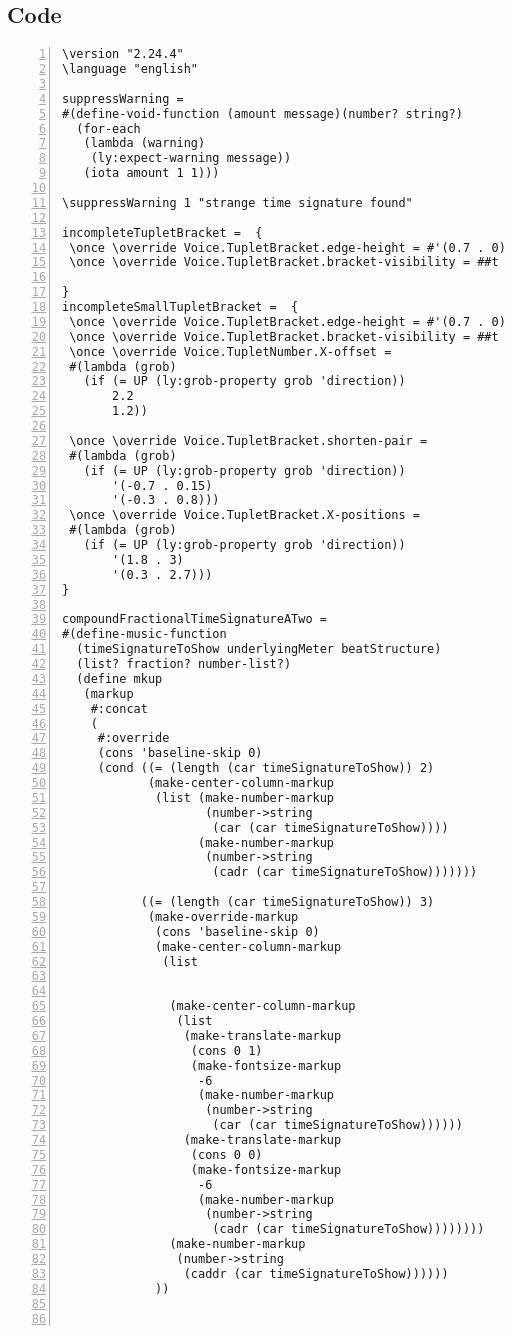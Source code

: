 \subsection{Code}
\begin{Verbatim}[numbers=left,xleftmargin=5mm]
\version "2.24.4"
\language "english"

suppressWarning =
#(define-void-function (amount message)(number? string?)
  (for-each
   (lambda (warning)
    (ly:expect-warning message))
   (iota amount 1 1)))

\suppressWarning 1 "strange time signature found"

incompleteTupletBracket =  {
 \once \override Voice.TupletBracket.edge-height = #'(0.7 . 0)
 \once \override Voice.TupletBracket.bracket-visibility = ##t

}
incompleteSmallTupletBracket =  {
 \once \override Voice.TupletBracket.edge-height = #'(0.7 . 0)
 \once \override Voice.TupletBracket.bracket-visibility = ##t
 \once \override Voice.TupletNumber.X-offset =
 #(lambda (grob)
   (if (= UP (ly:grob-property grob 'direction))
       2.2
       1.2))

 \once \override Voice.TupletBracket.shorten-pair =
 #(lambda (grob)
   (if (= UP (ly:grob-property grob 'direction))
       '(-0.7 . 0.15)
       '(-0.3 . 0.8)))
 \once \override Voice.TupletBracket.X-positions =
 #(lambda (grob)
   (if (= UP (ly:grob-property grob 'direction))
       '(1.8 . 3)
       '(0.3 . 2.7)))
}

compoundFractionalTimeSignatureATwo =
#(define-music-function
  (timeSignatureToShow underlyingMeter beatStructure)
  (list? fraction? number-list?)
  (define mkup
   (markup
    #:concat
    (
     #:override
     (cons 'baseline-skip 0)
     (cond ((= (length (car timeSignatureToShow)) 2)
            (make-center-column-markup
             (list (make-number-markup
                    (number->string
                     (car (car timeSignatureToShow))))
                   (make-number-markup
                    (number->string
                     (cadr (car timeSignatureToShow)))))))

           ((= (length (car timeSignatureToShow)) 3)
            (make-override-markup
             (cons 'baseline-skip 0)
             (make-center-column-markup
              (list


               (make-center-column-markup
                (list
                 (make-translate-markup
                  (cons 0 1)
                  (make-fontsize-markup
                   -6
                   (make-number-markup
                    (number->string
                     (car (car timeSignatureToShow))))))
                 (make-translate-markup
                  (cons 0 0)
                  (make-fontsize-markup
                   -6
                   (make-number-markup
                    (number->string
                     (cadr (car timeSignatureToShow))))))))
               (make-number-markup
                (number->string
                 (caddr (car timeSignatureToShow))))))
             ))



\end{Verbatim}
